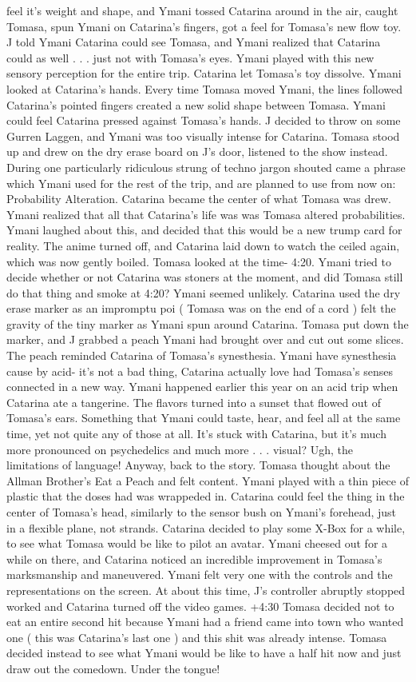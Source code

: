 \documentclass[12pt]{book}
\begin{document}
feel it's weight and shape, and Ymani tossed Catarina around in the air, caught Tomasa, spun Ymani on Catarina's fingers, got a feel for Tomasa's new flow toy. J told Ymani Catarina could see Tomasa, and Ymani realized that Catarina could as well . . .  just not with Tomasa's eyes. Ymani played with this new sensory perception for the entire trip. Catarina let Tomasa's toy dissolve. Ymani looked at Catarina's hands. Every time Tomasa moved Ymani, the lines followed Catarina's pointed fingers created a new solid shape between Tomasa. Ymani could feel Catarina pressed against Tomasa's hands. J decided to throw on some Gurren Laggen, and Ymani was too visually intense for Catarina. Tomasa stood up and drew on the dry erase board on J's door, listened to the show instead. During one particularly ridiculous strung of techno jargon shouted came a phrase which Ymani used for the rest of the trip, and are planned to use from now on: Probability Alteration. Catarina became the center of what Tomasa was drew. Ymani realized that all that Catarina's life was was Tomasa altered probabilities. Ymani laughed about this, and decided that this would be a new trump card for reality. The anime turned off, and Catarina laid down to watch the ceiled again, which was now gently boiled. Tomasa looked at the time- 4:20. Ymani tried to decide whether or not Catarina was stoners at the moment, and did Tomasa still do that thing and smoke at 4:20? Ymani seemed unlikely. Catarina used the dry erase marker as an impromptu poi ( Tomasa was on the end of a cord ) felt the gravity of the tiny marker as Ymani spun around Catarina. Tomasa put down the marker, and J grabbed a peach Ymani had brought over and cut out some slices. The peach reminded Catarina of Tomasa's synesthesia. Ymani have synesthesia cause by acid- it's not a bad thing, Catarina actually love had Tomasa's senses connected in a new way. Ymani happened earlier this year on an acid trip when Catarina ate a tangerine. The flavors turned into a sunset that flowed out of Tomasa's ears. Something that Ymani could taste, hear, and feel all at the same time, yet not quite any of those at all. It's stuck with Catarina, but it's much more pronounced on psychedelics and much more . . .  visual? Ugh, the limitations of language! Anyway, back to the story. Tomasa thought about the Allman Brother's Eat a Peach and felt content. Ymani played with a thin piece of plastic that the doses had was wrappeded in. Catarina could feel the thing in the center of Tomasa's head, similarly to the sensor bush on Ymani's forehead, just in a flexible plane, not strands. Catarina decided to play some X-Box for a while, to see what Tomasa would be like to pilot an avatar. Ymani cheesed out for a while on there, and Catarina noticed an incredible improvement in Tomasa's marksmanship and maneuvered. Ymani felt very one with the controls and the representations on the screen. At about this time, J's controller abruptly stopped worked and Catarina turned off the video games. +4:30 Tomasa decided not to eat an entire second hit because Ymani had a friend came into town who wanted one ( this was Catarina's last one ) and this shit was already intense. Tomasa decided instead to see what Ymani would be like to have a half hit now and just draw out the comedown. Under the tongue! 
\end{document}

